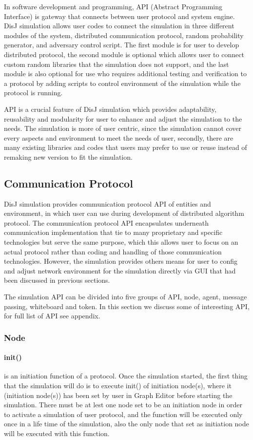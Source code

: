 In software development and programming, API (Abstract Programming Interface) is gateway that connects between user protocol and system engine. DisJ simulation allows user codes to connect the simulation in three different modules of the system, distributed communication protocol, random probability generator, and adversary control script. The first module is for user to develop distributed protocol, the second module is optional which allows user to connect custom random libraries that the simulation does not support, and the last module is also optional for use who requires additional testing and verification to a protocol by adding scripts to control environment of the simulation while the protocol is running.

API is a crucial feature of DisJ simulation which provides adaptability, reusability and modularity for user to enhance and adjust the simulation to the needs. The simulation is more of user centric, since the simulation cannot cover every aspects and environment to meet the needs of user, secondly, there are many existing libraries and codes that users may prefer to use or reuse instead of remaking new version to fit the simulation.

\subsection{Communication Protocol}
DisJ simulation provides communication protocol API of entities and environment, in which user can use during development of distributed algorithm protocol. The communication protocol API encapsulates underneath communication implementation that tie to many proprietary and specific technologies but serve the same purpose, which this allows user to focus on an actual protocol rather than coding and handling of those communication technologies. However, the simulation provides others means for user to config and adjust network environment for the simulation directly via GUI that had been discussed in previous sections.

The simulation API can be divided into five groups of API, node, agent, message passing, whiteboard and token. In this section we discuss some of interesting API, for full list of API see appendix.


\subsubsection*{Node}

\paragraph{init()} is an initiation function of a protocol. Once the simulation started, the first thing that the simulation will do is to execute init() of initiation node(s), where it (initiation node(s)) has been set by user in Graph Editor before starting the simulation. There must be at lest one node set to be an initiation node in order to activate a simulation of user protocol, and the function will be executed only once in a life time of the simulation, also the only node that set as initiation node will be executed with this function.

